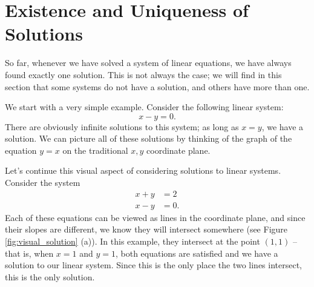 \section{Existence and Uniqueness of Solutions}\label{sec:existence}


So far, whenever we have solved a system of linear equations, we have always found exactly one solution. This is not always the case; we will find in this section that some systems do not have a solution, and others have more than one. 


We start with a very simple example. Consider the following linear system: $$x-y=0.$$ There are obviously infinite solutions to this system; as long as $x=y$, we have a solution. We can picture all of these solutions by thinking of the graph of the equation $y=x$ on the traditional $x,y$ coordinate plane.

Let's continue this visual aspect of considering solutions to linear systems. Consider the system \begin{align*} x+y&=2\\ x-y&=0. \end{align*} Each of these equations can be viewed as lines in the coordinate plane, and since their slopes are different, we know they will intersect somewhere (see Figure \ref{fig:visual_solution} (a)). In this example, they intersect at the point $(1,1)$ -- that is, when $x=1$ and $y=1$, both equations are satisfied and we have a solution to our linear system. Since this is the only place the two lines intersect, this is the only solution. 

